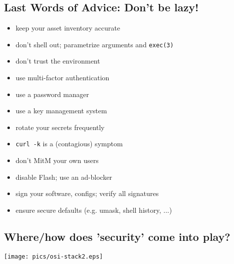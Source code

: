 \documentclass[xga]{xdvislides}
\begin{document}
% 

\subsection{Last Words of Advice: Don't be lazy!}
\begin{itemize}
	\item keep your asset inventory accurate
	\item don't shell out; parametrize arguments and {\tt exec(3)}
	\item don't trust the environment
	\item use multi-factor authentication
	\item use a password manager
	\item use a key management system
	\item rotate your secrets frequently
	\item {\tt curl -k} is a (contagious) symptom
	\item don't MitM your own users
	\item disable Flash; use an ad-blocker
	\item sign your software, configs; verify all signatures
	\item ensure secure defaults (e.g. umask, shell history, ...)
\end{itemize}

\subsection{Where/how does 'security' come into play?}
\vspace*{\fill}
\begin{center}
	\texttt{[image: pics/osi-stack2.eps]} \\
\end{center}
\vspace*{\fill}
\end{document}
